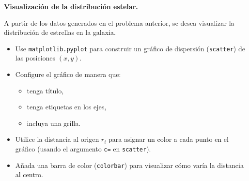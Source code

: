 \item \textbf{Visualización de la distribución estelar.}

\begin{tcolorbox}[colback=blue!2!white,colframe=blue!55!black,title={Enunciado}]

A partir de los datos generados en el problema anterior, se desea visualizar la distribución de estrellas en la galaxia.

\begin{itemize}
\item[(a)] Use \texttt{matplotlib.pyplot} para construir un gráfico de dispersión (\texttt{scatter}) de las posiciones \((x,y)\).

\item[(b)] Configure el gráfico de manera que:
\begin{itemize}
\item tenga título,
\item tenga etiquetas en los ejes,
\item incluya una grilla.
\end{itemize}

\item[(c)] Utilice la distancia al origen \(r_i\) para asignar un color a cada punto en el gráfico (usando el argumento \texttt{c=} en \texttt{scatter}).

\item[(d)] Añada una barra de color (\texttt{colorbar}) para visualizar cómo varía la distancia al centro.

\end{itemize}

\end{tcolorbox}

